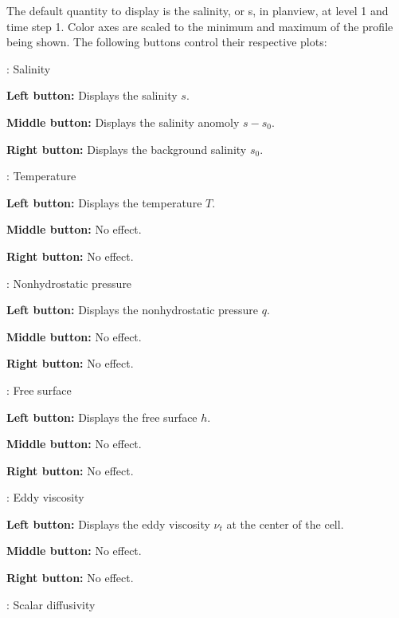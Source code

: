 The default quantity to display is the salinity, or s, in planview, at level 1 and time step 1.  Color axes
are scaled to the minimum and maximum of the profile being shown.  The following
buttons control their respective plots:
\begin{list}{}
\item {}: Salinity
\begin{list}{}
\item {\bf Left button:} Displays the salinity $s$.
\item {\bf Middle button:} Displays the salinity anomoly $s-s_0$.
\item {\bf Right button:} Displays the background salinity $s_0$.
\end{list}
\item {}: Temperature
\begin{list}{}
\item {\bf Left button:} Displays the temperature $T$.
\item {\bf Middle button:} No effect.
\item {\bf Right button:} No effect.
\end{list}
\item {}: Nonhydrostatic pressure
\begin{list}{}
\item {\bf Left button:} Displays the nonhydrostatic pressure $q$.
\item {\bf Middle button:} No effect.
\item {\bf Right button:} No effect.
\end{list}
\item {}: Free surface
\begin{list}{}
\item {\bf Left button:} Displays the free surface $h$.
\item {\bf Middle button:} No effect.
\item {\bf Right button:} No effect.
\end{list}
\item {}:  Eddy viscosity 
\begin{list}{}
\item {\bf Left button:} Displays the eddy viscosity $\nu_t$ at the center of the cell.
\item {\bf Middle button:} No effect.
\item {\bf Right button:} No effect.
\end{list}
\item {}: Scalar diffusivity

\end{list}
